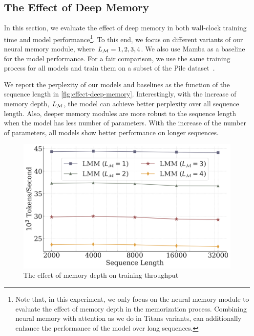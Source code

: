 \subsection{The Effect of Deep Memory}\label{sec:deep-memory-exp}
In this section, we evaluate the effect of deep memory in both wall-clock training time and model performance\footnote{Note that, in this experiment, we only focus on the neural memory module to evaluate the effect of memory depth in the memorization process. Combining neural memory with attention as we do in Titans variants, can additionally enhance the performance of the model over long sequences.}. To this end, we focus on different variants of our neural memory module, where $L_{\mathcal{M}} = 1, 2, 3, 4$. We also use Mamba as a baseline for the model performance. For a fair comparison, we use the same training process for all models and train them on a subset of the Pile dataset~\citep{gao2020pile}. 

We report the perplexity of our models and baselines as the function of the sequence length in \autoref{fig:effect-deep-memory}. Interestingly, with the increase of memory depth, $L_{\mathcal{M}}$, the model can achieve better perplexity over all sequence length. Also, deeper memory modules are more robust to the sequence length when the model has less number of parameters. With the increase of the number of parameters, all models show better performance on longer sequences.  


\begin{figure}
    \centering
    \vspace{-4ex}
        \includegraphics[width=\linewidth]{Figures/deep-memory-efficiency.png}
    \caption{The effect of memory depth on training throughput}
    \label{fig:effect-deep-memory-efficiency}
    \vspace{-8ex}
\end{figure}

